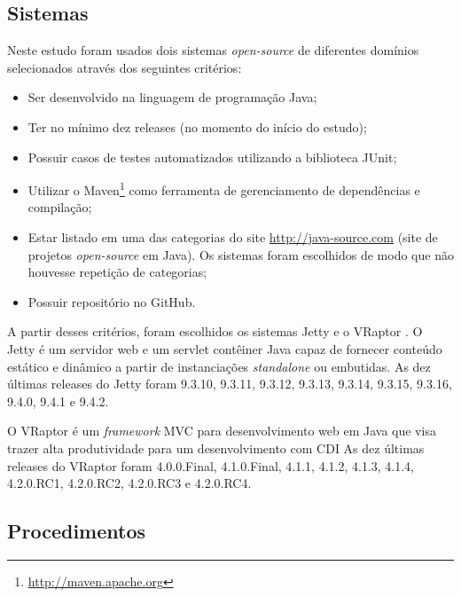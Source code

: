 \begin{itemize}
\end{itemize}

\subsection{Sistemas} \label{subsec:avaliacao-sistemas}

Neste estudo foram usados dois sistemas \textit{open-source} de diferentes domínios selecionados através dos seguintes critérios:
\begin{itemize}
  \item Ser desenvolvido na linguagem de programação Java;
  \item Ter no mínimo dez releases (no momento do início do estudo);
  \item Possuir casos de testes automatizados utilizando a biblioteca JUnit;
  \item Utilizar o Maven\footnote{\href{http://maven.apache.org}{http://maven.apache.org}} como ferramenta de gerenciamento de dependências e compilação;
  \item Estar listado em uma das categorias do site \href{http://java-source.com}{http://java-source.com} (site de projetos \textit{open-source} em Java). Os sistemas foram escolhidos de modo que não houvesse repetição de categorias;
  \item Possuir repositório no GitHub.
\end{itemize}

A partir desses critérios, foram escolhidos os sistemas Jetty \cite{Jetty2016} e o VRaptor \cite{VRaptor2017}. O Jetty é um servidor web e um servlet contêiner Java capaz de fornecer conteúdo estático e dinâmico a partir de instanciações \textit{standalone} ou embutidas. As dez últimas releases do Jetty foram 9.3.10, 9.3.11, 9.3.12, 9.3.13, 9.3.14, 9.3.15, 9.3.16, 9.4.0, 9.4.1 e 9.4.2.

O VRaptor é um \textit{framework} MVC para desenvolvimento web em Java que visa trazer alta produtividade para um desenvolvimento com CDI  As dez últimas releases do VRaptor foram 4.0.0.Final, 4.1.0.Final, 4.1.1, 4.1.2, 4.1.3, 4.1.4, 4.2.0.RC1, 4.2.0.RC2, 4.2.0.RC3 e 4.2.0.RC4.

\subsection{Procedimentos} \label{subsec:avaliacao-procedimentos}


